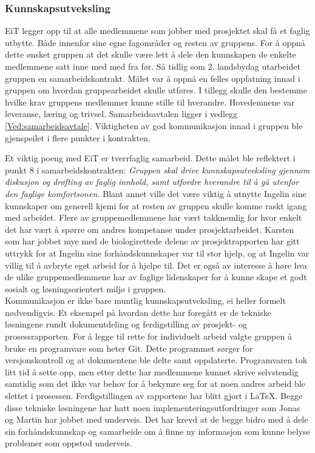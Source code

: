 \subsubsection{Kunnskapsutveksling}
EiT legger opp til at alle medlemmene som jobber med prosjektet skal få et faglig utbytte.
Både innenfor sine egne fagområder og resten av gruppens.
For å oppnå dette ønsket gruppen at det skulle være lett å dele den kunnskapen de enkelte medlemmene satt inne med med fra før.
Så tidlig som 2. landsbydag utarbeidet gruppen en samarbeidskontrakt.
Målet var å oppnå en felles oppfatning innad i gruppen om hvordan gruppearbeidet skulle utføres.
I tillegg skulle den bestemme hvilke krav gruppens medlemmer kunne stille til hverandre.
Hovedemnene var leveranse, læring og trivsel.
Samarbeidsavtalen ligger i vedlegg \ref{Ved:samarbeidsavtale}.
Viktigheten av god kommunikasjon innad i gruppen ble gjenspeilet i flere punkter i kontrakten. 

Et viktig poeng med EiT er tverrfaglig samarbeid. Dette målet ble reflektert i punkt 8 i samarbeidskontrakten: \textit{Gruppen skal drive kunnskapsutveksling gjennom diskusjon og drøfting av faglig innhold, samt utfordre hverandre til å gå utenfor den faglige komfortsonen.} Blant annet ville det være viktig å utnytte Ingelin sine kunnskaper om generell kjemi for at resten av gruppen skulle komme raskt igang med arbeidet.
Flere av gruppemedlemmene har vært takknemlig for hvor enkelt det har vært å spørre om andres kompetanse under prosjektarbeidet.
Karsten som har jobbet mye med de biologirettede delene av prosjektrapporten har gitt uttrykk for at Ingelin sine forhåndskunnskaper var til stor hjelp, og at Ingelin var villig til å avbryte eget arbeid for å hjelpe til.
Det er også av interesse å høre hva de ulike gruppemedlemmene har av faglige lidenskaper for å kunne skape et godt sosialt og løsningsorientert miljø i gruppen. \\

Kommunikasjon er ikke bare muntlig kunnskapsutveksling, ei heller formelt nødvendigvis.
Et eksempel på hvordan dette har foregått er de tekniske løsningene rundt dokumentdeling og ferdigstilling av prosjekt- og prosessrapporten.
For å legge til rette for individuelt arbeid valgte gruppen å bruke en programvare som heter Git.
Dette programmet sørger for versjonskontroll og at dokumentene ble delte samt oppdaterte.
Programvaren tok litt tid å sette opp, men etter dette har medlemmene kunnet skrive selvstendig samtidig som det ikke var behov for å bekymre seg for at noen andres arbeid ble slettet i prosessen.
Ferdigstillingen av rapportene har blitt gjort i \LaTeX.
Begge disse tekniske løsningene har hatt noen implementeringsutfordringer som Jonas og Martin har jobbet med underveis.
Det har krevd at de begge bidro med å dele sin forhåndskunnskap og samarbeide om å finne ny informasjon som kunne belyse problemer som oppstod underveis.


